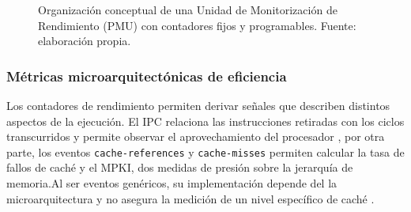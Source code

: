 \begin{figure}[H]
\centering


\caption[Unidad de Monitorización de Rendimiento (PMU)]{Organización conceptual de una Unidad de Monitorización de
Rendimiento (PMU) con contadores fijos y programables.
Fuente: elaboración propia.}
\label{fig:pmu-conceptual}
\end{figure}

\subsubsection{Métricas microarquitectónicas de eficiencia}
\label{sec:marco-metricas-eficiencia}

Los contadores de rendimiento permiten derivar señales que describen distintos
aspectos de la ejecución. El IPC relaciona las instrucciones retiradas con los
ciclos transcurridos y permite observar el aprovechamiento del procesador
\cite[Ch.~6]{Gregg2020}, por otra parte, los eventos \texttt{cache-references} y
\texttt{cache-misses} permiten calcular la tasa de fallos de caché y el MPKI,
dos medidas de presión sobre la jerarquía de memoria.Al ser eventos genéricos, su implementación depende del la microarquitectura y no
asegura la medición de un nivel específico de caché \cite{LinuxPerfEventOpen2026}.

